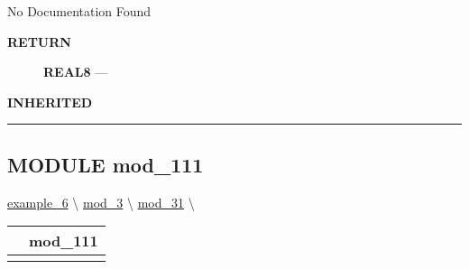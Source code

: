 \par





No Documentation Found








\par
\begin{description}
\item [\colorbox{tagtype}{\color{white} \textbf{\textsf{RETURN}}}] \textbf{REAL8} --- 
\end{description}






\par
\begin{description}
\item [\colorbox{tagtype}{\color{white} \textbf{\textsf{INHERITED}}}] 
\end{description}



\rule{\linewidth}{0.5pt}
\subsection*{\textsf{\colorbox{headtoc}{\color{white} MODULE}
mod\_111}}

\hypertarget{ecldoc:example_6.mod_1.mod_11.mod_111}{}
\hspace{0pt} \hyperlink{ecldoc:example_6}{example_6} \textbackslash 
\hspace{0pt} \hyperlink{ecldoc:example_6.mod_3}{mod_3} \textbackslash 
\hspace{0pt} \hyperlink{ecldoc:example_6.mod_3.mod_31}{mod_31} \textbackslash 

{\renewcommand{\arraystretch}{1.5}
\begin{tabularx}{\textwidth}{|>{\raggedright\arraybackslash}l|X|}
\hline
\hspace{0pt}\mytexttt{\color{red} } & \textbf{mod\_111} \\
\hline
\multicolumn{2}{|>{\raggedright\arraybackslash}X|}{\hspace{0pt}\mytexttt{\color{param} (real8 a\_111)}} \\
\hline
\end{tabularx}
}

\par





